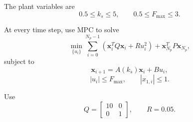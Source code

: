 The plant variables are
\begin{equation}
0.5\leq k_s\leq5,
\qquad
0.5\leq F_{\max}\leq3.
\end{equation}

At every time step, use MPC to solve
\begin{equation}
\min_{\{u_i\}}
\sum_{i=0}^{N_p-1}
\left(
\mathbf{x}_i^TQ\mathbf{x}_i
+
Ru_i^2
\right)
+
\mathbf{x}_{N_p}^TP\mathbf{x}_{N_p},
\end{equation}
subject to
\begin{equation}
\mathbf{x}_{i+1}=A(k_s)\mathbf{x}_i+Bu_i,
\end{equation}
\begin{equation}
|u_i|\leq F_{\max},
\qquad
|x_{1,i}|\leq1.
\end{equation}

Use
\begin{equation}
Q=
\begin{bmatrix}
10&0\\
0&1
\end{bmatrix},
\qquad
R=0.05.
\end{equation}

